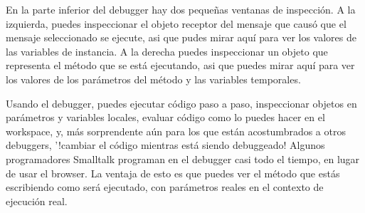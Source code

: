 \documentclass[a4paper,10pt,twoside]{book}
\begin{document}
En la parte inferior del debugger hay dos pequeñas ventanas de inspecci\'on. A la izquierda, puedes inspeccionar el objeto receptor del mensaje que caus\'o que el mensaje seleccionado se ejecute, asi que pudes mirar aqu\'i para ver los valores de las variables de instancia.
A la derecha puedes inspeccionar un objeto que representa el m\'etodo que se est\'a ejecutando, asi que puedes mirar aqu\'i para ver los valores de los par\'ametros del m\'etodo y las variables temporales.


Usando el debugger, puedes ejecutar c\'odigo paso a paso, inspeccionar objetos en par\'ametros y variables locales, evaluar c\'odigo como lo puedes hacer en el workspace, y, m\'as sorprendente a\'un para los que est\'an acostumbrados a otros debuggers, '!cambiar el c\'odigo mientras est\'a siendo debuggeado! Algunos programadores Smalltalk programan en el debugger casi todo el tiempo, en lugar de usar el browser. La ventaja de esto es que puedes ver el m\'etodo que est\'as escribiendo como ser\'a ejecutado, con par\'ametros reales en el contexto de ejecuci\'on real.
\end{document}
